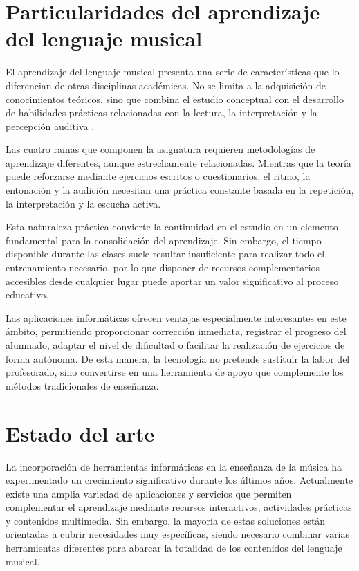 \section{Particularidades del aprendizaje del lenguaje musical}

El aprendizaje del lenguaje musical presenta una serie de características que lo diferencian de otras disciplinas académicas. No se limita a la adquisición de conocimientos teóricos, sino que combina el estudio conceptual con el desarrollo de habilidades prácticas relacionadas con la lectura, la interpretación y la percepción auditiva \cite{UNIR_PedagogiaMusical}.

Las cuatro ramas que componen la asignatura requieren metodologías de aprendizaje diferentes, aunque estrechamente relacionadas. Mientras que la teoría puede reforzarse mediante ejercicios escritos o cuestionarios, el ritmo, la entonación y la audición necesitan una práctica constante basada en la repetición, la interpretación y la escucha activa.

Esta naturaleza práctica convierte la continuidad en el estudio en un elemento fundamental para la consolidación del aprendizaje. Sin embargo, el tiempo disponible durante las clases suele resultar insuficiente para realizar todo el entrenamiento necesario, por lo que disponer de recursos complementarios accesibles desde cualquier lugar puede aportar un valor significativo al proceso educativo.

Las aplicaciones informáticas ofrecen ventajas especialmente interesantes en este ámbito, permitiendo proporcionar corrección inmediata, registrar el progreso del alumnado, adaptar el nivel de dificultad o facilitar la realización de ejercicios de forma autónoma. De esta manera, la tecnología no pretende sustituir la labor del profesorado, sino convertirse en una herramienta de apoyo que complemente los métodos tradicionales de enseñanza.

\section{Estado del arte}

La incorporación de herramientas informáticas en la enseñanza de la música ha experimentado un crecimiento significativo durante los últimos años. Actualmente existe una amplia variedad de aplicaciones y servicios que permiten complementar el aprendizaje mediante recursos interactivos, actividades prácticas y contenidos multimedia. Sin embargo, la mayoría de estas soluciones están orientadas a cubrir necesidades muy específicas, siendo necesario combinar varias herramientas diferentes para abarcar la totalidad de los contenidos del lenguaje musical.

